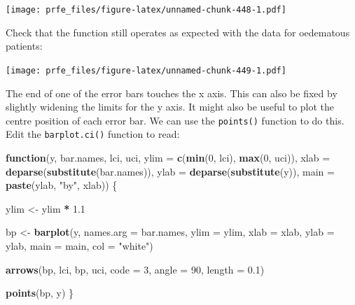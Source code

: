 \documentclass[12pt,a4paper]{book}
\newenvironment{Shaded}{\begin{snugshade}}{\end{snugshade}}
\newcommand{\ControlFlowTok}[1]{\textcolor[rgb]{0.13,0.29,0.53}{\textbf{#1}}}
\newcommand{\DataTypeTok}[1]{\textcolor[rgb]{0.13,0.29,0.53}{#1}}
\newcommand{\DecValTok}[1]{\textcolor[rgb]{0.00,0.00,0.81}{#1}}
\newcommand{\FloatTok}[1]{\textcolor[rgb]{0.00,0.00,0.81}{#1}}
\newcommand{\KeywordTok}[1]{\textcolor[rgb]{0.13,0.29,0.53}{\textbf{#1}}}
\newcommand{\NormalTok}[1]{#1}
\newcommand{\OperatorTok}[1]{\textcolor[rgb]{0.81,0.36,0.00}{\textbf{#1}}}
\newcommand{\StringTok}[1]{\textcolor[rgb]{0.31,0.60,0.02}{#1}}
\theoremstyle{definition}
\theoremstyle{definition}
\theoremstyle{definition}
\theoremstyle{remark}
\begin{document}
\texttt{[image: prfe\_files/figure-latex/unnamed-chunk-448-1.pdf]}

Check that the function still operates as expected with the data for
oedematous patients:

\begin{Shaded}
\end{Shaded}

\texttt{[image: prfe\_files/figure-latex/unnamed-chunk-449-1.pdf]}

The end of one of the error bars touches the x axis. This can also be
fixed by slightly widening the limits for the y axis. It might also be
useful to plot the centre position of each error bar. We can use the
\texttt{points()} function to do this. Edit the \texttt{barplot.ci()}
function to read:

\begin{Shaded}
\begin{Highlighting}[]
\ControlFlowTok{function}\NormalTok{(y, bar.names, lci, uci,}
         \DataTypeTok{ylim =} \KeywordTok{c}\NormalTok{(}\KeywordTok{min}\NormalTok{(}\DecValTok{0}\NormalTok{, lci), }\KeywordTok{max}\NormalTok{(}\DecValTok{0}\NormalTok{, uci)),}
         \DataTypeTok{xlab =} \KeywordTok{deparse}\NormalTok{(}\KeywordTok{substitute}\NormalTok{(bar.names)),}
         \DataTypeTok{ylab =} \KeywordTok{deparse}\NormalTok{(}\KeywordTok{substitute}\NormalTok{(y)),}
         \DataTypeTok{main =} \KeywordTok{paste}\NormalTok{(ylab, }\StringTok{"by"}\NormalTok{, xlab)) \{}
     
\NormalTok{  ylim <-}\StringTok{ }\NormalTok{ylim }\OperatorTok{*}\StringTok{ }\FloatTok{1.1}
     
\NormalTok{  bp <-}\StringTok{ }\KeywordTok{barplot}\NormalTok{(y, }\DataTypeTok{names.arg =}\NormalTok{ bar.names, }\DataTypeTok{ylim =}\NormalTok{ ylim, }\DataTypeTok{xlab =}\NormalTok{ xlab,}
                \DataTypeTok{ylab =}\NormalTok{ ylab, }\DataTypeTok{main =}\NormalTok{ main, }\DataTypeTok{col =} \StringTok{"white"}\NormalTok{)}
     
  \KeywordTok{arrows}\NormalTok{(bp, lci, bp, uci, }\DataTypeTok{code =} \DecValTok{3}\NormalTok{, }\DataTypeTok{angle =} \DecValTok{90}\NormalTok{, }\DataTypeTok{length =} \FloatTok{0.1}\NormalTok{)}
     
  \KeywordTok{points}\NormalTok{(bp, y)}
\NormalTok{\}}
\end{Highlighting}
\end{Shaded}
\end{document}
